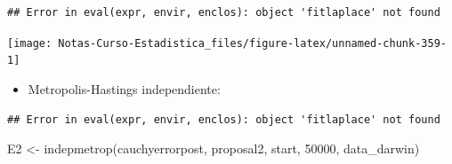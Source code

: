 \documentclass[
  12pt,
]{book}
\newenvironment{Shaded}{\begin{snugshade}}{\end{snugshade}}
\newcommand{\AttributeTok}[1]{\textcolor[rgb]{0.77,0.63,0.00}{#1}}
\newcommand{\DecValTok}[1]{\textcolor[rgb]{0.00,0.00,0.81}{#1}}
\newcommand{\FloatTok}[1]{\textcolor[rgb]{0.00,0.00,0.81}{#1}}
\newcommand{\FunctionTok}[1]{\textcolor[rgb]{0.00,0.00,0.00}{#1}}
\newcommand{\NormalTok}[1]{#1}
\newcommand{\OtherTok}[1]{\textcolor[rgb]{0.56,0.35,0.01}{#1}}
\newcommand{\SpecialCharTok}[1]{\textcolor[rgb]{0.00,0.00,0.00}{#1}}
\newcommand{\StringTok}[1]{\textcolor[rgb]{0.31,0.60,0.02}{#1}}
\providecommand{\tightlist}{%
  \setlength{\itemsep}{0pt}\setlength{\parskip}{0pt}}
\theoremstyle{definition}
\theoremstyle{definition}
\theoremstyle{definition}
\theoremstyle{definition}
\theoremstyle{remark}
\begin{document}
\begin{verbatim}
## Error in eval(expr, envir, enclos): object 'fitlaplace' not found
\end{verbatim}

\begin{Shaded}
\end{Shaded}

\begin{center}\texttt{[image: Notas-Curso-Estadistica\_files/figure-latex/unnamed-chunk-359-1]} \end{center}

\begin{itemize}
\tightlist
\item
  Metropolis-Hastings independiente:
\end{itemize}

\begin{Shaded}
\end{Shaded}

\begin{verbatim}
## Error in eval(expr, envir, enclos): object 'fitlaplace' not found
\end{verbatim}

\begin{Shaded}
\begin{Highlighting}[]
\NormalTok{E2 }\OtherTok{\textless{}{-}} \FunctionTok{indepmetrop}\NormalTok{(cauchyerrorpost, proposal2, start,}
    \DecValTok{50000}\NormalTok{, data\_darwin)}
\end{Highlighting}
\end{Shaded}
\end{document}
